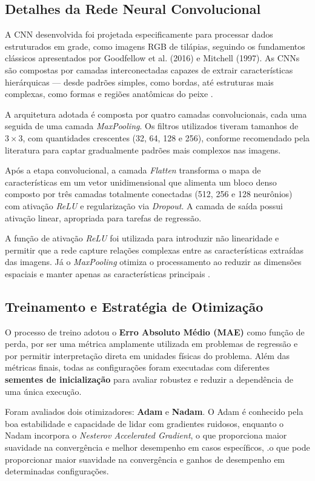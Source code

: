 \documentclass[sigconf,nonacm,screen]{acmart}
\begin{document}
\subsection{Detalhes da Rede Neural Convolucional}

A CNN desenvolvida foi projetada especificamente para processar dados estruturados em grade, como imagens RGB de tilápias, seguindo os fundamentos clássicos apresentados por Goodfellow et al. (2016) e Mitchell (1997). As CNNs são compostas por camadas interconectadas capazes de extrair características hierárquicas — desde padrões simples, como bordas, até estruturas mais complexas, como formas e regiões anatômicas do peixe .

A arquitetura adotada é composta por quatro camadas convolucionais, cada uma seguida de uma camada \textit{MaxPooling}. Os filtros utilizados tiveram tamanhos de $3 \times 3$, com quantidades crescentes (32, 64, 128 e 256), conforme recomendado pela literatura para captar gradualmente padrões mais complexos nas imagens.

Após a etapa convolucional, a camada \textit{Flatten} transforma o mapa de características em um vetor unidimensional que alimenta um bloco denso composto por três camadas totalmente conectadas (512, 256 e 128 neurônios) com ativação \textit{ReLU} e regularização via \textit{Dropout}. A camada de saída possui ativação linear, apropriada para tarefas de regressão.

A função de ativação \textit{ReLU} foi utilizada para introduzir não linearidade e permitir que a rede capture relações complexas entre as características extraídas das imagens. Já o \textit{MaxPooling} otimiza o processamento ao reduzir as dimensões espaciais e manter apenas as características principais .


\subsection{Treinamento e Estratégia de Otimização}

O processo de treino adotou o \textbf{Erro Absoluto Médio (MAE)} como função de perda, por ser uma métrica amplamente utilizada em problemas de regressão e por permitir interpretação direta em unidades físicas do problema.
Além das métricas finais, todas as configurações foram executadas com diferentes \textbf{sementes de inicialização} para avaliar robustez e reduzir a dependência de uma única execução.


Foram avaliados dois otimizadores: \textbf{Adam} e \textbf{Nadam}. O Adam é conhecido pela boa estabilidade e capacidade de lidar com gradientes ruidosos, enquanto o Nadam incorpora o \textit{Nesterov Accelerated Gradient}, o que proporciona maior suavidade na convergência e melhor desempenho em casos específicos, .o que pode proporcionar maior suavidade na convergência e ganhos de desempenho em determinadas configurações.
\end{document}
